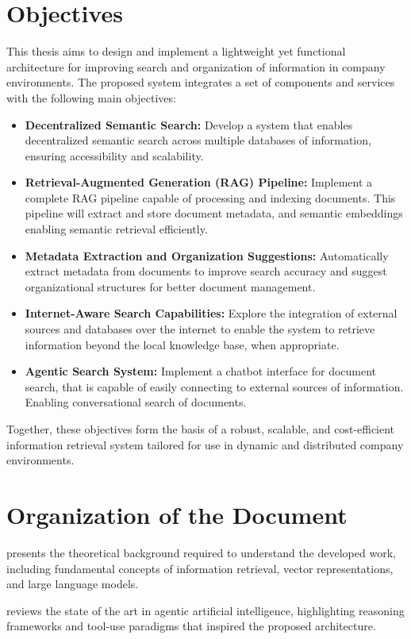 \section{Objectives}
This thesis aims to design and implement a lightweight yet functional architecture for improving search and organization of information in company environments. The proposed system integrates a set of components and services with the following main objectives:
\begin{itemize}
\item \textbf{Decentralized Semantic Search:} Develop a system that enables decentralized semantic search across multiple databases of information, ensuring accessibility and scalability.
\item \textbf{Retrieval-Augmented Generation (RAG) Pipeline:} Implement a complete RAG pipeline capable of processing and indexing documents. This pipeline will extract and store document metadata, and semantic embeddings enabling semantic retrieval efficiently.
\item \textbf{Metadata Extraction and Organization Suggestions:} Automatically extract metadata from documents to improve search accuracy and suggest organizational structures for better document management.
\item \textbf{Internet-Aware Search Capabilities:} Explore the integration of external sources and databases over the internet to enable the system to retrieve information beyond the local knowledge base, when appropriate.
\item \textbf{Agentic Search System:} Implement a chatbot interface for document search, that is capable of easily connecting to external sources of information. Enabling conversational search of documents.
\end{itemize}
Together, these objectives form the basis of a robust, scalable, and cost-efficient information retrieval system tailored for use in dynamic and distributed company environments.
\section{Organization of the Document}

 presents the theoretical background required to understand the developed work, including fundamental concepts of information retrieval, vector representations, and large language models. 

 reviews the state of the art in agentic artificial intelligence, highlighting reasoning frameworks and tool-use paradigms that inspired the proposed architecture. 


